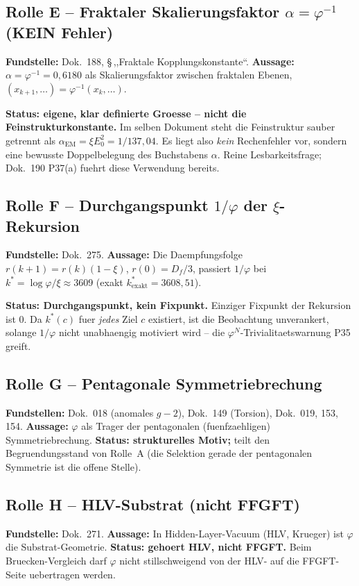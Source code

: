 \subsection{Rolle E -- Fraktaler Skalierungsfaktor $\alpha=\varphi^{-1}$
(KEIN Fehler)}
\textbf{Fundstelle:} Dok.~188, \S\,,,Fraktale Kopplungskonstante``.
\textbf{Aussage:} $\alpha=\varphi^{-1}=0{,}6180$ als Skalierungsfaktor zwischen
fraktalen Ebenen, $(x_{k+1},\dots)=\varphi^{-1}(x_k,\dots)$.
\begin{important}
\textbf{Status: eigene, klar definierte Groesse -- nicht die
Feinstrukturkonstante.} Im selben Dokument steht die Feinstruktur sauber
getrennt als $\alpha_{\text{EM}}=\xi E_0^2=1/137{,}04$. Es liegt also
\emph{kein} Rechenfehler vor, sondern eine bewusste Doppelbelegung des
Buchstabens $\alpha$. Reine Lesbarkeitsfrage; Dok.~190 P37(a) fuehrt diese
Verwendung bereits.
\end{important}

\subsection{Rolle F -- Durchgangspunkt $1/\varphi$ der $\xi$-Rekursion}
\textbf{Fundstelle:} Dok.~275. \textbf{Aussage:} Die Daempfungsfolge
$r(k{+}1)=r(k)(1-\xi)$, $r(0)=D_f/3$, passiert $1/\varphi$ bei
$k^* = \log\varphi/\xi \approx 3609$ (exakt $k^*_{\text{exakt}}=3608{,}51$).
\begin{caution}
\textbf{Status: Durchgangspunkt, kein Fixpunkt.}
Einziger Fixpunkt der Rekursion ist $0$. Da $k^*(c)$ fuer \emph{jedes} Ziel
$c$ existiert, ist die Beobachtung unverankert, solange $1/\varphi$ nicht
unabhaengig motiviert wird -- die $\varphi^N$-Trivialitaetswarnung P35 greift.
\end{caution}

\subsection{Rolle G -- Pentagonale Symmetriebrechung}
\textbf{Fundstellen:} Dok.~018 (anomales $g{-}2$), Dok.~149 (Torsion),
Dok.~019, 153, 154. \textbf{Aussage:} $\varphi$ als Trager der pentagonalen
(fuenfzaehligen) Symmetriebrechung. \textbf{Status: strukturelles Motiv;}
teilt den Begruendungsstand von Rolle~A (die Selektion gerade der pentagonalen
Symmetrie ist die offene Stelle).

\subsection{Rolle H -- HLV-Substrat (nicht FFGFT)}
\textbf{Fundstelle:} Dok.~271. \textbf{Aussage:} In Hidden-Layer-Vacuum (HLV,
Krueger) ist $\varphi$ die Substrat-Geometrie. \textbf{Status: gehoert HLV,
nicht FFGFT.} Beim Bruecken-Vergleich darf $\varphi$ nicht stillschweigend von
der HLV- auf die FFGFT-Seite uebertragen werden.

